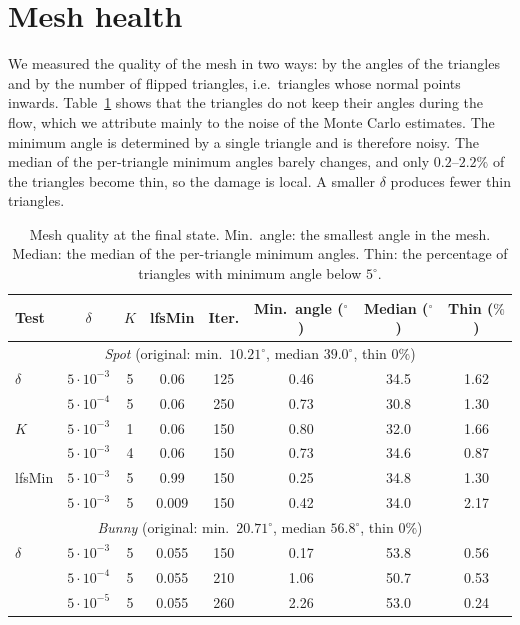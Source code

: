\documentclass[
]{elteiktdk}[2024/04/26]
\begin{document}
	
	\section{Mesh health}
	\label{meshHealt}
	
	We measured the quality of the mesh in two ways: by the angles of the triangles and by the number of flipped triangles, i.e.\ triangles whose normal points inwards. Table~\ref{tab:bad_triangles} shows that the triangles do not keep their angles during the flow, which we attribute mainly to the noise of the Monte Carlo estimates. The minimum angle is determined by a single triangle and is therefore noisy. The median of the per-triangle minimum angles barely changes, and only $0.2$--$2.2\%$ of the triangles become thin, so the damage is local. A smaller $\delta$ produces fewer thin triangles.
	
	\begin{table}[H]
		\centering
		\small
		\begin{tabular}{l c c c c c c c}
			\hline
			Test & $\delta$ & $K$ & lfsMin & Iter. & Min.\ angle ($^\circ$) & Median ($^\circ$) & Thin ($\%$) \\
			\hline
			\multicolumn{8}{c}{\textit{Spot} \quad (original: min.\ $10.21^\circ$, median $39.0^\circ$, thin $0\%$)} \\
			\hline
			$\delta$ & $5\cdot10^{-3}$ & 5 & 0.06  & 125 & 0.46 & 34.5 & 1.62 \\
			& $5\cdot10^{-4}$ & 5 & 0.06  & 250 & 0.73 & 30.8 & 1.30 \\[2pt]
			$K$      & $5\cdot10^{-3}$ & 1 & 0.06  & 150 & 0.80 & 32.0 & 1.66 \\
			& $5\cdot10^{-3}$ & 4 & 0.06  & 150 & 0.73 & 34.6 & 0.87 \\[2pt]
			lfsMin   & $5\cdot10^{-3}$ & 5 & 0.99  & 150 & 0.25 & 34.8 & 1.30 \\
			& $5\cdot10^{-3}$ & 5 & 0.009 & 150 & 0.42 & 34.0 & 2.17 \\
			\hline
			\multicolumn{8}{c}{\textit{Bunny} \quad (original: min.\ $20.71^\circ$, median $56.8^\circ$, thin $0\%$)} \\
			\hline
			$\delta$ & $5\cdot10^{-3}$ & 5 & 0.055 & 150 & 0.17 & 53.8 & 0.56 \\
			& $5\cdot10^{-4}$ & 5 & 0.055 & 210 & 1.06 & 50.7 & 0.53 \\
			& $5\cdot10^{-5}$ & 5 & 0.055 & 260 & 2.26 & 53.0 & 0.24 \\
			\hline
		\end{tabular}
		\caption{Mesh quality at the final state. Min.\ angle: the smallest angle in the mesh. Median: the median of the per-triangle minimum angles. Thin: the percentage of triangles with minimum angle below $5^\circ$.}
		\label{tab:bad_triangles}
	\end{table}
	
\end{document}
